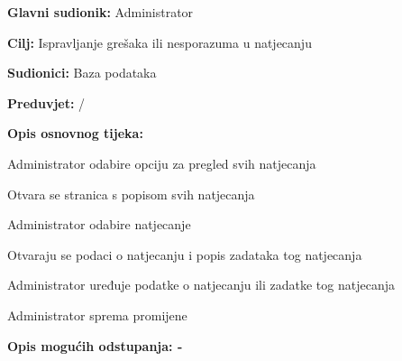 					\noindent {}
						\begin{packed_item}
							
							\item \textbf{Glavni sudionik: } Administrator
							\item  \textbf{Cilj:} Ispravljanje grešaka ili nesporazuma u natjecanju
							\item  \textbf{Sudionici:} Baza podataka
							\item  \textbf{Preduvjet:}  / 
							\item  \textbf{Opis osnovnog tijeka:}
							
							\item[] \begin{packed_enum}
								\item Administrator odabire opciju za pregled svih natjecanja
								\item Otvara se stranica s popisom svih natjecanja
								\item Administrator odabire natjecanje		
								\item Otvaraju se podaci o natjecanju i popis zadataka tog natjecanja
								\item Administrator uređuje podatke o natjecanju ili zadatke tog natjecanja
								\item Administrator sprema promijene
							\end{packed_enum}
							
							\item  \textbf{Opis mogućih odstupanja: - } 
					
						\end{packed_item}
						
